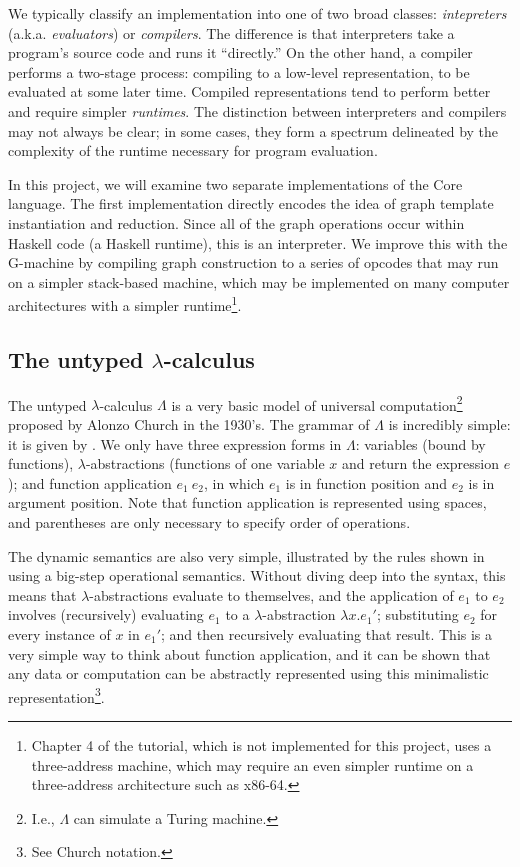 We typically classify an implementation into one of two broad classes: \textit{intepreters} (a.k.a. \textit{evaluators}) or \textit{compilers}. The difference is that interpreters take a program's source code and runs it ``directly.'' On the other hand, a compiler performs a two-stage process: compiling to a low-level representation, to be evaluated at some later time. Compiled representations tend to perform better and require simpler \textit{runtimes}. The distinction between interpreters and compilers may not always be clear; in some cases, they form a spectrum delineated by the complexity of the runtime necessary for program evaluation.

In this project, we will examine two separate implementations of the Core language. The first implementation directly encodes the idea of graph template instantiation and reduction. Since all of the graph operations occur within Haskell code (a Haskell runtime), this is an interpreter. We improve this with the G-machine by compiling graph construction to a series of opcodes that may run on a simpler stack-based machine, which may be implemented on many computer architectures with a simpler runtime\footnote{Chapter 4 of the tutorial, which is not implemented for this project, uses a three-address machine, which may require an even simpler runtime on a three-address architecture such as x86-64.}.

\subsection{The untyped $\lambda$-calculus}
\label{sec:ulc}

The untyped $\lambda$-calculus $\Lambda$ is a very basic model of universal computation\footnote{I.e., $\Lambda$ can simulate a Turing machine.} proposed by Alonzo Church in the 1930's. The grammar of $\Lambda$ is incredibly simple: it is given by . We only have three expression forms in $\Lambda$: variables (bound by functions), $\lambda$-abstractions (functions of one variable $x$ and return the expression $e$); and function application $e_1\ e_2$, in which $e_1$ is in function position and $e_2$ is in argument position. Note that function application is represented using spaces, and parentheses are only necessary to specify order of operations.

The dynamic semantics are also very simple, illustrated by the rules shown in  using a big-step operational semantics. Without diving deep into the syntax, this means that $\lambda$-abstractions evaluate to themselves, and the application of $e_1$ to $e_2$ involves (recursively) evaluating  $e_1$ to a $\lambda$-abstraction $\lambda x.e_1'$; substituting $e_2$ for every instance of $x$ in $e_1'$; and then recursively evaluating that result. This is a very simple way to think about function application, and it can be shown that any data or computation can be abstractly represented using this minimalistic representation\footnote{See Church notation.}.


